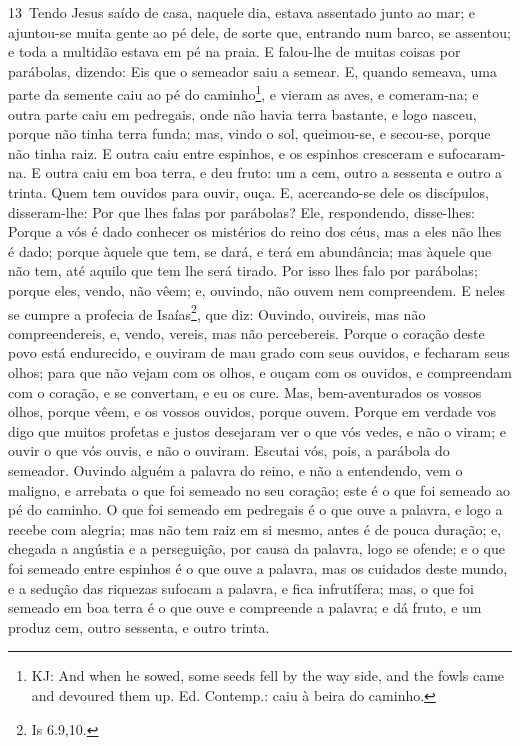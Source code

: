 \lettrine{13}\ Tendo Jesus saído de casa, naquele dia, estava
assentado junto ao mar; e ajuntou-se muita gente ao pé dele, de
sorte que, entrando num barco, se assentou; e toda a multidão estava
em pé na praia. E falou-lhe de muitas coisas por parábolas,
dizendo: Eis que o semeador saiu a semear. E, quando semeava,
uma parte da semente caiu ao pé do caminho\footnote{KJ: And when he
sowed, some seeds fell by the way side, and the fowls came and
devoured them up. Ed. Contemp.: caiu à beira do caminho.}, e vieram
as aves, e comeram-na; e outra parte caiu em pedregais, onde não
havia terra bastante, e logo nasceu, porque não tinha terra funda;
mas, vindo o sol, queimou-se, e secou-se, porque não tinha raiz.
E outra caiu entre espinhos, e os espinhos cresceram e
sufocaram-na. E outra caiu em boa terra, e deu fruto: um a cem,
outro a sessenta e outro a trinta. Quem tem ouvidos para ouvir,
ouça. E, acercando-se dele os discípulos, disseram-lhe: Por
que lhes falas por parábolas? Ele, respondendo, disse-lhes:
Porque a vós é dado conhecer os mistérios do reino dos céus, mas a
eles não lhes é dado; porque àquele que tem, se dará, e terá
em abundância; mas àquele que não tem, até aquilo que tem lhe será
tirado. Por isso lhes falo por parábolas; porque eles, vendo,
não vêem; e, ouvindo, não ouvem nem compreendem. E neles se
cumpre a profecia de Isaías\footnote{Is 6.9,10.}, que diz: Ouvindo,
ouvireis, mas não compreendereis, e, vendo, vereis, mas não
percebereis. Porque o coração deste povo está endurecido, e
ouviram de mau grado com seus ouvidos, e fecharam seus olhos; para
que não vejam com os olhos, e ouçam com os ouvidos, e compreendam
com o coração, e se convertam, e eu os cure. Mas,
bem-aventurados os vossos olhos, porque vêem, e os vossos ouvidos,
porque ouvem. Porque em verdade vos digo que muitos profetas
e justos desejaram ver o que vós vedes, e não o viram; e ouvir o que
vós ouvis, e não o ouviram. Escutai vós, pois, a parábola do
semeador. Ouvindo alguém a palavra do reino, e não a
entendendo, vem o maligno, e arrebata o que foi semeado no seu
coração; este é o que foi semeado ao pé do caminho. O que foi
semeado em pedregais é o que ouve a palavra, e logo a recebe com
alegria; mas não tem raiz em si mesmo, antes é de pouca
duração; e, chegada a angústia e a perseguição, por causa da
palavra, logo se ofende; e o que foi semeado entre espinhos é
o que ouve a palavra, mas os cuidados deste mundo, e a sedução das
riquezas sufocam a palavra, e fica infrutífera; mas, o que
foi semeado em boa terra é o que ouve e compreende a palavra; e dá
fruto, e um produz cem, outro sessenta, e outro trinta.

